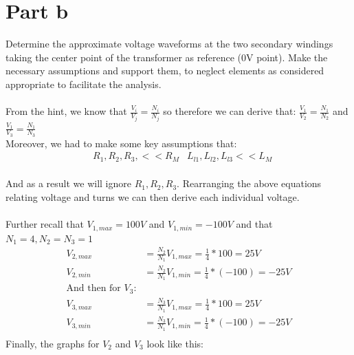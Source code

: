 \documentclass{article}
\begin{document}
\section*{Part b}
Determine the approximate voltage waveforms at the two secondary windings taking the center point of the transformer as reference (0V point). Make the necessary assumptions and support them, to neglect elements as considered appropriate to facilitate the analysis.\\
\\From the hint, we know that $\frac{V_i}{V_j} = \frac{N_i}{N_j}$ so therefore we can derive that: $\frac{V_1}{V_2} = \frac{N_1}{N_2}$ and $\frac{V_1}{V_3} = \frac{N_1}{N_3}$ \\
Moreover, we had to make some key assumptions that: 
\begin{align*}
    &R_1, R_2, R_3, << R_M
    &L_{l1}, L_{l2}, L_{l3} << L_M
\end{align*}
\\ And as a result we will ignore $R_1, R_2, R_3$. Rearranging the above equations relating voltage and turns we can then derive each individual voltage.\\
\\Further recall that $V_{1,max} = 100V$ and $V_{1,min} = -100V$ and that $N_1=4, N_2=N_3 = 1$
\begin{align*}
    V_{2,max} &= \frac{N_2}{N_1}V_{1,max}=\frac{1}{4}*100 = 25V \\
    V_{2,min} &= \frac{N_2}{N_1}V_{1,min}=\frac{1}{4}*(-100) = -25V \\
    \mbox{And then for $V_3$:}\\
    V_{3,max} &= \frac{N_3}{N_1}V_{1,max}=\frac{1}{4}*100 = 25V \\
    V_{3,min} &= \frac{N_3}{N_1}V_{1,min}=\frac{1}{4}*(-100) = -25V \\
\end{align*}
Finally, the graphs for $V_2$ and $V_3$ look like this:
\begin{center}
\end{center}
\end{document}
